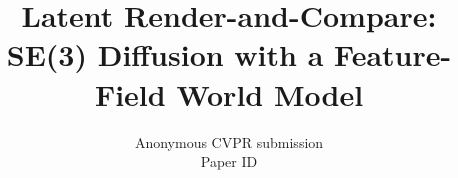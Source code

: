 \documentclass[10pt,twocolumn,letterpaper]{article}
\title{Latent Render-and-Compare: SE(3) Diffusion with a Feature-Field World Model}
\author{Anonymous CVPR submission\\
Paper ID \paperID}
\begin{document}

{
    \small
    
    
}
\end{document}
